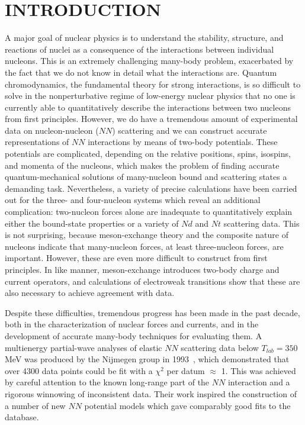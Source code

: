 \maketitle

\section{INTRODUCTION}

A major goal of nuclear physics is to understand the stability,
structure, and reactions of nuclei as a consequence of the interactions
between individual nucleons.
This is an extremely challenging many-body problem, exacerbated by the fact 
that we do not know in detail what the interactions are.
Quantum chromodynamics, the fundamental theory for strong interactions, is so 
difficult to solve in the nonperturbative regime of low-energy nuclear physics
that no one is currently able to quantitatively describe the interactions between two
nucleons from first principles.
However, we do have a tremendous amount of experimental data on nucleon-nucleon
($N\!N$) scattering and we can construct accurate representations of 
$N\!N$ interactions by means of two-body potentials.
These potentials are complicated, depending on the relative positions,
spins, isospins, and momenta of the nucleons, which makes the problem of
finding accurate quantum-mechanical solutions of many-nucleon bound and
scattering states a demanding task.
Nevertheless, a variety of precise calculations have been carried out for 
the three- and four-nucleon systems which reveal an additional complication:
two-nucleon forces alone are inadequate to quantitatively explain either the 
bound-state properties or a variety of $Nd$ and $Nt$ scattering data.
This is not surprising, because meson-exchange theory and the composite
nature of nucleons indicate that many-nucleon forces, at least three-nucleon
forces, are important.
However, these are even more difficult to construct from first principles.
In like manner, meson-exchange introduces two-body charge and current 
operators, and calculations of electroweak transitions show that these
are also necessary to achieve agreement with data.

Despite these difficulties, tremendous progress has been made in the past
decade, both in the characterization of nuclear forces and currents, and
in the development of accurate many-body techniques for evaluating them.
A multienergy partial-wave analyses of elastic $N\!N$ scattering data 
below $T_{lab} = 350$ MeV was produced by the Nijmegen group in 
1993~\cite{SKRS93}, which demonstrated that over 4300 data 
points could be fit with a $\chi^2$ per datum $\approx$ 1.
This was achieved by careful attention to the known long-range part of
the $N\!N$ interaction and a rigorous winnowing of inconsistent data.
Their work inspired the construction of a number of new $N\!N$ potential 
models which gave comparably good fits to the database.

